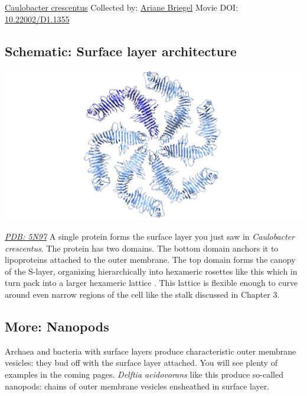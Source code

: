\documentclass[]{tufte-book}
\begin{document}
\hypertarget{htmlwidget-e522eff71966432b1a9a}{}

\label{fig:2-6}\protect\hyperlink{tree}{Caulobacter crescentus} Collected by: \protect\hyperlink{ariane_briegel}{Ariane Briegel} Movie DOI: \href{https://doi.org/10.22002/D1.1355}{10.22002/D1.1355}

\hypertarget{Surface_layer_architecture}{%
\subsection*{Schematic: Surface layer architecture}\label{Surface_layer_architecture}}

\includegraphics{img/schematics/2_6_1}

\href{http://rcsb.org/structure/5N97}{\emph{PDB: 5N97}}
A single protein forms the surface layer you just saw in \emph{Caulobacter crescentus}. The protein has two domains. The bottom domain anchors it to lipoproteins attached to the outer membrane. The top domain forms the canopy of the S-layer, organizing hierarchically into hexameric rosettes like this which in turn pack into a larger hexameric lattice \citep{bharat2017}. This lattice is flexible enough to curve around even narrow regions of the cell like the stalk discussed in Chapter 3.

\hypertarget{Nanopods}{%
\subsection*{More: Nanopods}\label{Nanopods}}

Archaea and bacteria with surface layers produce characteristic outer membrane vesicles: they bud off with the surface layer attached. You will see plenty of examples in the coming pages. \emph{Delftia acidovorans} like this produce so-called nanopods: chains of outer membrane vesicles ensheathed in surface layer.
\end{document}
